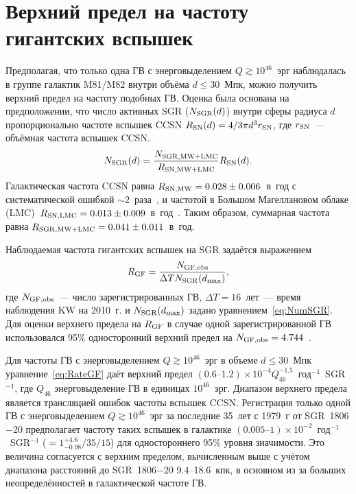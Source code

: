 \section{Верхний предел на частоту гигантских вспышек}\label{GF_rate}
Предполагая, что только одна ГВ с энерговыделением $Q \gtrsim 10^{46}$~эрг наблюдалась 
в группе галактик M81/M82 внутри объёма $d \le 30$~Мпк, можно получить верхний предел 
на частоту подобных ГВ. Оценка была основана на предположении, что число активных SGR ($N_{\mathrm{SGR}}(d)$) 
внутри сферы радиуса $d$ пропорционально частоте вспышек CCSN 
$R_{\mathrm{SN}}(d)=4/3 \pi d^3 r_{\mathrm{SN}}$, где $r_{\mathrm{SN}}$~--- объёмная частота вспышек CCSN.
\begin{equation}\label{eq:NumSGR}
N_{{\mathrm{SGR}}} (d) = \frac{N_{{\mathrm{SGR}}, {\mathrm{MW+LMC}}}}{ R_{{\mathrm{SN}}, {\mathrm{MW+LMC}}}} R_{{\mathrm{SN}}}(d).
\end{equation}
Галактическая частота CCSN равна $R_{{\mathrm{SN}}, {\mathrm{MW}}} = 0.028\pm0.006$~в~год 
с систематической ошибкой $\sim 2$~раза~\citep{Li2011part3}, и частотой в Большом 
Магеллановом облаке (LMC)~$R_{{\mathrm{SN}}, {\mathrm{LMC}}} = 0.013\pm0.009$~в~год~\citep{Bergh1991}. 
Таким образом, суммарная частота равна $R_{{\mathrm{SGR}}, {\mathrm{MW+LMC}}} = 0.041\pm0.011$~в~год. 


Наблюдаемая частота гигантских вспышек на SGR задаётся выражением
\begin{equation}\label{eq:RateGF}
R_{{\mathrm{GF}}} = \frac{N_{{\mathrm{GF}},{\mathrm{obs}}}}{\Delta T N_{{\mathrm{SGR}}}(d_{{\mathrm{max}}})} ,
\end{equation}
где $N_{{\mathrm{GF}},{\mathrm{obs}}}$~--- число зарегистрированных ГВ, 
$\Delta T=16$~лет~--- время наблюдения KW на 2010~г. и $N_{{\mathrm{SGR}}}(d_{{\mathrm{max}}})$ 
задано уравнением~\ref{eq:NumSGR}. Для оценки верхнего предела на $R_{{\mathrm{GF}}}$ 
в случае одной зарегистрированной ГВ использовался 95\% односторонний верхний предел
на $N_{{\mathrm{GF}}, {\mathrm{obs}}}=4.744$~\citep{Gehrels1986}.

Для частоты ГВ с энерговыделением $Q \gtrsim 10^{46}$~эрг в объеме $d\le30$~Мпк уравнение~\ref{eq:RateGF} 
даёт верхний предел ${(0.6\textrm{--}1.2)\times 10^{-4} Q_{46}^{-1.5}}$~год$^{-1}$~SGR$^{-1}$, 
где $Q_{46}$ энерговыделение ГВ в единицах $10^{46}$~эрг. Диапазон верхнего предела 
является трансляцией ошибок частоты вспышек CCSN. Регистрация только 
одной ГВ с энерговыделением $Q \gtrsim 10^{46}$~эрг за последние 35~лет 
с 1979~г от SGR~1806$-$20 предполагает частоту таких вспышек в галактике 
${(0.005\textrm{--}1)\times 10^{-2}}$~год$^{-1}$~SGR$^{-1}$ ($=1_{-0.98}^{+4.6} / 35 / 15 $) 
для одностороннего 95\% уровня значимости. Это величина согласуется с верхним пределом, 
вычисленным выше с учётом диапазона расстояний до SGR~1806$-$20 9.4--18.6~кпк, 
в основном из за больших неопределённостей в галактической частоте ГВ. 

